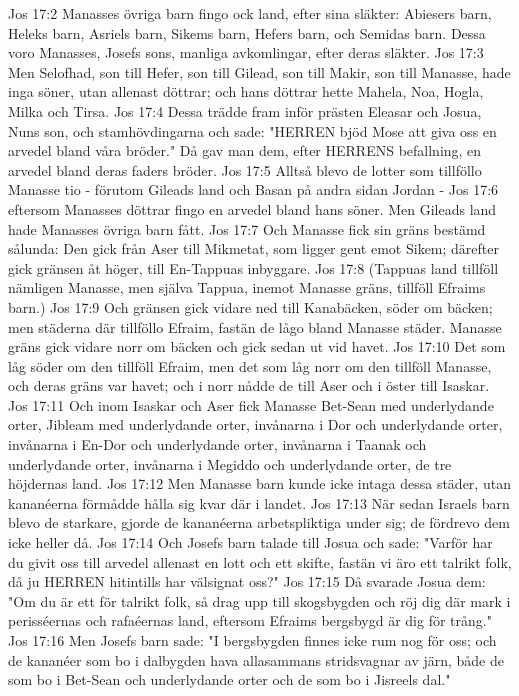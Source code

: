 Jos 17:2  Manasses övriga barn fingo ock land, efter sina släkter: Abiesers barn, Heleks barn, Asriels barn, Sikems barn, Hefers barn, och Semidas barn. Dessa voro Manasses, Josefs sons, manliga avkomlingar, efter deras släkter.
Jos 17:3  Men Selofhad, son till Hefer, son till Gilead, son till Makir, son till Manasse, hade inga söner, utan allenast döttrar; och hans döttrar hette Mahela, Noa, Hogla, Milka och Tirsa.
Jos 17:4  Dessa trädde fram inför prästen Eleasar och Josua, Nuns son, och stamhövdingarna och sade: "HERREN bjöd Mose att giva oss en arvedel bland våra bröder." Då gav man dem, efter HERRENS befallning, en arvedel bland deras faders bröder.
Jos 17:5  Alltså blevo de lotter som tillföllo Manasse tio - förutom Gileads land och Basan på andra sidan Jordan -
Jos 17:6  eftersom Manasses döttrar fingo en arvedel bland hans söner. Men Gileads land hade Manasses övriga barn fått.
Jos 17:7  Och Manasse fick sin gräns bestämd sålunda: Den gick från Aser till Mikmetat, som ligger gent emot Sikem; därefter gick gränsen åt höger, till En-Tappuas inbyggare.
Jos 17:8  (Tappuas land tillföll nämligen Manasse, men själva Tappua, inemot Manasse gräns, tillföll Efraims barn.)
Jos 17:9  Och gränsen gick vidare ned till Kanabäcken, söder om bäcken; men städerna där tillföllo Efraim, fastän de lågo bland Manasse städer. Manasse gräns gick vidare norr om bäcken och gick sedan ut vid havet.
Jos 17:10  Det som låg söder om den tillföll Efraim, men det som låg norr om den tillföll Manasse, och deras gräns var havet; och i norr nådde de till Aser och i öster till Isaskar.
Jos 17:11  Och inom Isaskar och Aser fick Manasse Bet-Sean med underlydande orter, Jibleam med underlydande orter, invånarna i Dor och underlydande orter, invånarna i En-Dor och underlydande orter, invånarna i Taanak och underlydande orter, invånarna i Megiddo och underlydande orter, de tre höjdernas land.
Jos 17:12  Men Manasse barn kunde icke intaga dessa städer, utan kananéerna förmådde hålla sig kvar där i landet.
Jos 17:13  När sedan Israels barn blevo de starkare, gjorde de kananéerna arbetspliktiga under sig; de fördrevo dem icke heller då.
Jos 17:14  Och Josefs barn talade till Josua och sade: "Varför har du givit oss till arvedel allenast en lott och ett skifte, fastän vi äro ett talrikt folk, då ju HERREN hitintills har välsignat oss?"
Jos 17:15  Då svarade Josua dem: "Om du är ett för talrikt folk, så drag upp till skogsbygden och röj dig där mark i perisséernas och rafaéernas land, eftersom Efraims bergsbygd är dig för trång."
Jos 17:16  Men Josefs barn sade: "I bergsbygden finnes icke rum nog för oss; och de kananéer som bo i dalbygden hava allasammans stridsvagnar av järn, både de som bo i Bet-Sean och underlydande orter och de som bo i Jisreels dal."
